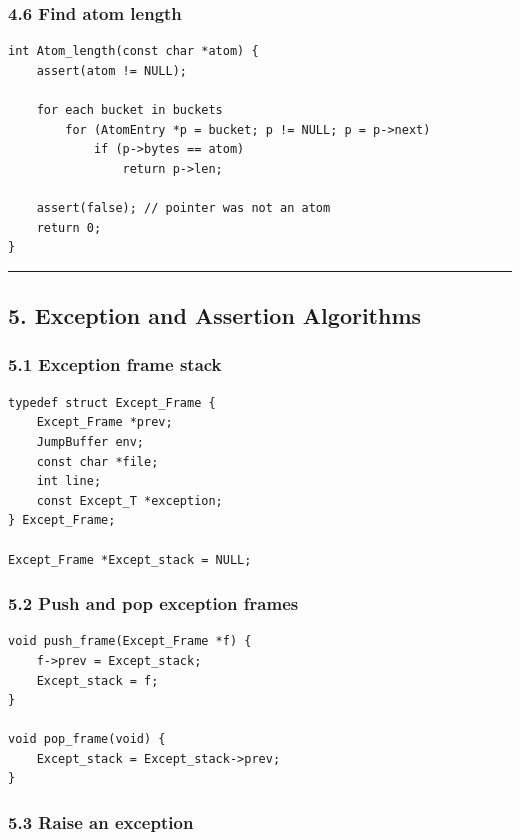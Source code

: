 \documentclass[11pt]{article}
\begin{document}
\subsubsection{4.6 Find atom length}\label{find-atom-length}

\begin{verbatim}
int Atom_length(const char *atom) {
    assert(atom != NULL);

    for each bucket in buckets
        for (AtomEntry *p = bucket; p != NULL; p = p->next)
            if (p->bytes == atom)
                return p->len;

    assert(false); // pointer was not an atom
    return 0;
}
\end{verbatim}

\begin{center}\rule{0.5\linewidth}{0.5pt}\end{center}

\subsection{5. Exception and Assertion Algorithms}\label{exception-and-assertion-algorithms}

\subsubsection{5.1 Exception frame stack}\label{exception-frame-stack}

\begin{verbatim}
typedef struct Except_Frame {
    Except_Frame *prev;
    JumpBuffer env;
    const char *file;
    int line;
    const Except_T *exception;
} Except_Frame;

Except_Frame *Except_stack = NULL;
\end{verbatim}

\subsubsection{5.2 Push and pop exception frames}\label{push-and-pop-exception-frames}

\begin{verbatim}
void push_frame(Except_Frame *f) {
    f->prev = Except_stack;
    Except_stack = f;
}

void pop_frame(void) {
    Except_stack = Except_stack->prev;
}
\end{verbatim}

\subsubsection{5.3 Raise an exception}\label{raise-an-exception}
\end{document}
